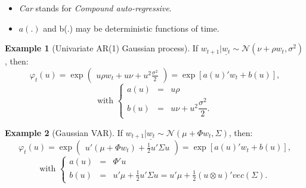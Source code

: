 \documentclass[
  12pt,
]{book}
\providecommand{\tightlist}{%
  \setlength{\itemsep}{0pt}\setlength{\parskip}{0pt}}
\theoremstyle{definition}
\theoremstyle{definition}
\newtheorem{example}{Example}[chapter]
\theoremstyle{definition}
\theoremstyle{definition}
\theoremstyle{remark}
\begin{document}
\begin{itemize}
\tightlist
\item
  \emph{Car} stands for \emph{Compound auto-regressive}.
\item
  \(a(.)\) and b(.) may be deterministic functions of time.
\end{itemize}

\begin{example}[Univariate AR(1) Gaussian process]
\protect\hypertarget{exm:GAR1}{}\label{exm:GAR1}If \(w_{t+1}|\underline{w_t} \sim \mathcal{N}(\nu+\rho w_t, \sigma^2)\), then:
\[
\varphi_t(u) = \exp\left(
\begin{array}{l}
u \rho w_t + u \nu + u^2  \frac{\sigma^2}{2}
\end{array}
\right) = \exp[a(u)'w_t+b(u)],
\]
\[
\mbox{with }\left\{
\begin{array}{ccc}
a(u) &=& u \rho\\
b(u) &=& u \nu + u^2  \dfrac{\sigma^2}{2}.
\end{array}
\right.
\]
\end{example}

\begin{example}[Gaussian VAR]
\protect\hypertarget{exm:GVAR1}{}\label{exm:GVAR1}If \(w_{t+1}|\underline{w_t} \sim \mathcal{N}(\mu+\Phi w_t, \Sigma)\), then:
\[
\varphi_t(u) = \exp\left(
\begin{array}{l}
u' (\mu + \Phi  w_t)  +  \frac{1}{2} u' \Sigma u
\end{array}
\right) = \exp[a(u)'w_t+b(u)],
\]
\[
\mbox{with }\left\{
\begin{array}{ccl}
a(u) &=& \Phi'u\\
b(u) &=& u' \mu +  \frac{1}{2} u' \Sigma u = u' \mu + \frac{1}{2}(u \otimes u)' vec(\Sigma).
\end{array}
\right.
\]
\end{example}
\end{document}
